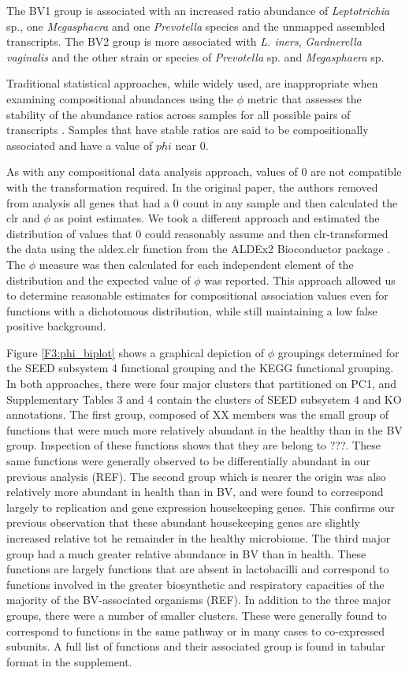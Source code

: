 \documentclass[10pt,letterpaper]{article}
\begin{document}
The BV1 group is associated with an increased ratio abundance of \emph{Leptotrichia} sp., one  \emph{Megasphaera} and one \emph{Prevotella} species and the unmapped assembled transcripts. The BV2 group is more associated with \emph{L. iners}, \emph{Gardnerella vaginalis} and the other strain or species of \emph{Prevotella} sp. and \emph{Megasphaera} sp. 


Traditional statistical approaches, while widely used, are inappropriate when examining compositional  abundances using the $\phi$ metric that assesses the stability of the abundance ratios across samples for all possible pairs of transcripts \cite{Lovell:2015}. Samples that have stable ratios are said to be compositionally associated and have a value of $phi$ near 0. 

As with any compositional data analysis approach, values of 0 are not compatible with the transformation required. In the original paper, the authors removed from analysis all genes that had a 0 count in any sample and then calculated the clr and $\phi$ as point estimates. We took a different approach and estimated the distribution of values that 0 could reasonably assume and then clr-transformed the data using the aldex.clr function from the ALDEx2 Bioconductor package \cite{fernandes:2013, fernandes:2014}. The $\phi$ measure was then calculated for each independent element of the distribution and the expected value of $\phi$ was reported. This approach allowed us to determine reasonable estimates for compositional association values even for functions with a dichotomous distribution, while still maintaining a low false positive background. 

Figure \ref{F3:phi_biplot} shows a graphical depiction of $\phi$ groupings determined for the SEED subsystem 4 functional grouping and the KEGG functional grouping. In both approaches, there were four major clusters that partitioned on PC1, and Supplementary Tables 3 and 4 contain the clusters of SEED subsystem 4 and KO annotations. The first group, composed of XX members was the small group of functions that were much more relatively abundant in the healthy than in the BV group. Inspection of these functions shows that they are belong to ???. These same functions were generally observed to be differentially abundant in our previous analysis (REF). The second group which is nearer the origin was also relatively more abundant in health than in BV, and were found to correspond largely to replication and gene expression housekeeping genes. This confirms our previous observation that these abundant housekeeping genes are slightly increased relative tot he remainder in the healthy microbiome. The third major group had a much greater relative abundance in BV than in health. These functions are largely functions that are absent in lactobacilli and correspond to functions involved in the greater biosynthetic and respiratory capacities of the majority of the BV-associated organisms (REF). In addition to the three major groups, there were a number of smaller clusters. These were generally found to correspond to functions in the same pathway or in many cases to co-expressed subunits.  A full list of functions and their associated group is found in tabular format in the supplement. 
\end{document}
